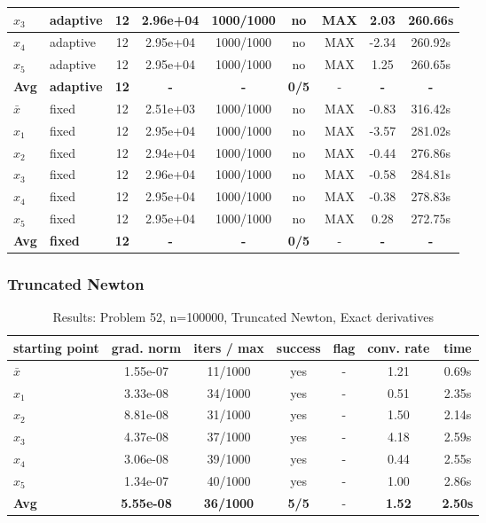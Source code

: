 \begin{longtable}{|l|l|c|c|c|c|c|c|c|}
\hline
$x_3$ & adaptive & 12 & 2.96e+04 & 1000/1000 & no & MAX & 2.03 & 260.66s \\
\hline
$x_4$ & adaptive & 12 & 2.95e+04 & 1000/1000 & no & MAX & -2.34 & 260.92s \\
\hline
$x_5$ & adaptive & 12 & 2.95e+04 & 1000/1000 & no & MAX & 1.25 & 260.65s \\
\hline
\hline\hline
\textbf{Avg} & \textbf{adaptive} & \textbf{12} & \textbf{-} & \textbf{-} & \textbf{0/5} & - & \textbf{-} & \textbf{-} \\
\hline\hline
\hline
$\bar{x}$ & fixed & 12 & 2.51e+03 & 1000/1000 & no & MAX & -0.83 & 316.42s \\
\hline
$x_1$ & fixed & 12 & 2.95e+04 & 1000/1000 & no & MAX & -3.57 & 281.02s \\
\hline
$x_2$ & fixed & 12 & 2.94e+04 & 1000/1000 & no & MAX & -0.44 & 276.86s \\
\hline
$x_3$ & fixed & 12 & 2.96e+04 & 1000/1000 & no & MAX & -0.58 & 284.81s \\
\hline
$x_4$ & fixed & 12 & 2.95e+04 & 1000/1000 & no & MAX & -0.38 & 278.83s \\
\hline
$x_5$ & fixed & 12 & 2.95e+04 & 1000/1000 & no & MAX & 0.28 & 272.75s \\
\hline
\hline\hline
\textbf{Avg} & \textbf{fixed} & \textbf{12} & \textbf{-} & \textbf{-} & \textbf{0/5} & - & \textbf{-} & \textbf{-} \\
\hline\hline
\end{longtable}


\subsubsection{Truncated Newton}

\begin{longtable}{|l|c|c|c|c|c|c|}
\caption{Results: Problem 52, n=100000, Truncated Newton, Exact derivatives} \\
\hline
\textbf{starting point} & \textbf{grad. norm} & \textbf{iters / max} & \textbf{success} & \textbf{flag} & \textbf{conv. rate} & \textbf{time} \\
\hline
\endfirsthead
\endhead
\endfoot
\hline
\endlastfoot
$\bar{x}$ & 1.55e-07 & 11/1000 & yes & - & 1.21 & 0.69s \\
\hline
$x_1$ & 3.33e-08 & 34/1000 & yes & - & 0.51 & 2.35s \\
\hline
$x_2$ & 8.81e-08 & 31/1000 & yes & - & 1.50 & 2.14s \\
\hline
$x_3$ & 4.37e-08 & 37/1000 & yes & - & 4.18 & 2.59s \\
\hline
$x_4$ & 3.06e-08 & 39/1000 & yes & - & 0.44 & 2.55s \\
\hline
$x_5$ & 1.34e-07 & 40/1000 & yes & - & 1.00 & 2.86s \\
\hline
\hline\hline
\textbf{Avg} & \textbf{5.55e-08} & \textbf{36/1000} & \textbf{5/5} & - & \textbf{1.52} & \textbf{2.50s} \\
\hline\hline
\end{longtable}


